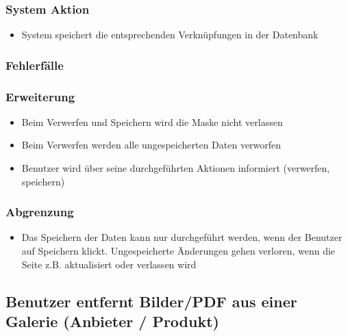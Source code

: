 \documentclass[a4paper,12pt]{article}
\begin{document}
\subsubsection{System Aktion}\label{system-aktion-6}

\begin{itemize}

\item
  System speichert die entsprechenden Verknüpfungen in der Datenbank
\end{itemize}

\subsubsection{Fehlerfälle}\label{fehlerfalle-6}

\subsubsection{Erweiterung}\label{erweiterung-6}

\begin{itemize}

\item
  Beim Verwerfen und Speichern wird die Maske nicht verlassen
\item
  Beim Verwerfen werden alle ungespeicherten Daten verworfen
\item
  Benutzer wird über seine durchgeführten Aktionen informiert
  (verwerfen, speichern)
\end{itemize}

\subsubsection{Abgrenzung}\label{abgrenzung-6}

\begin{itemize}

\item
  Das Speichern der Daten kann nur durchgeführt werden, wenn der
  Benutzer auf Speichern klickt. Ungespeicherte Änderungen gehen
  verloren, wenn die Seite z.B. aktualisiert oder verlassen wird
\end{itemize}

\subsection{Benutzer entfernt Bilder/PDF aus einer Galerie (Anbieter / Produkt)}\label{benutzer-entfernt-bilderpdf-aus-einer-galerie-anbieter-produkt}
\end{document}
